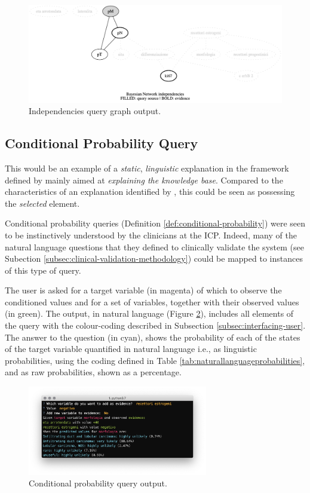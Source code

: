 \begin{figure}[htbp]
\centerline{\includegraphics[width=\textwidth]{results/images/independencies_output}}
\caption{Independencies query graph output.}
\label{fig:independencies_output}
\end{figure}

\subsection{Conditional Probability Query} \label{subsec:results-conditional-probability-query}
This would be an example of a \textit{static}, \textit{linguistic} explanation in the framework defined by \citet{lacave2002review} mainly aimed at \textit{explaining the knowledge base}.
Compared to the characteristics of an explanation identified by \citet{miller2018explanation}, this could be seen as possessing the \textit{selected} element.

Conditional probability queries (Definition \ref{def:conditional-probability}) were seen to be instinctively understood by the clinicians at the ICP.
Indeed, many of the natural language questions that they defined to clinically validate the system (see Subection \ref{subsec:clinical-validation-methodology}) could be mapped to instances of this type of query.

The user is asked for a target variable (in magenta) of which to observe the conditioned values and for a set of variables, together with their observed values (in green).
The output, in natural language (Figure \ref{fig:sw_3_query}), includes all elements of the query with the colour-coding described in Subsection \ref{subsec:interfacing-user}.
The answer to the question (in cyan), shows the probability of each of the states of the target variable quantified in natural language i.e., as linguistic probabilities, using the coding defined in Table \ref{tab:naturallanguageprobabilities}, and as raw probabilities, shown as a percentage.

\begin{figure}[htbp]
\centerline{\includegraphics[width=0.7\textwidth]{results/images/sw_3_query}}
\caption{Conditional probability query output.}
\label{fig:sw_3_query}
\end{figure}

